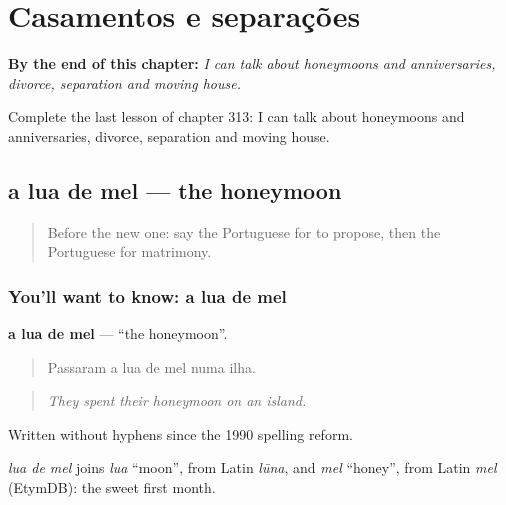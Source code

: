 
\chapter{Casamentos e separações}
\label{ch:pt-casamentos-e-separacoes}

\begin{chapteropening}
\textbf{By the end of this chapter:} \emph{I can talk about honeymoons and anniversaries, divorce, separation and moving house.}

Complete the last lesson of chapter 313: I can talk about honeymoons and anniversaries, divorce, separation and moving house.
\end{chapteropening}

\section[a lua de mel]{a lua de mel — the honeymoon}

\label{lesson:PT-C313-lua-de-mel}



\begin{quote}
Before the new one: say the Portuguese for to propose, then the Portuguese for matrimony.
\end{quote}

\subsection*{You'll want to know: a lua de mel}
\textbf{a lua de mel} — \textquotedblleft{}the honeymoon\textquotedblright{}.

\begin{quote}
Passaram a lua de mel numa ilha.
\end{quote}

\begin{quote}
\emph{They spent their honeymoon on an island.}
\end{quote}

Written without hyphens since the 1990 spelling reform.

\begin{cousinweb}
\emph{lua de mel} joins \emph{lua} \textquotedblleft{}moon\textquotedblright{}, from Latin \emph{lūna}, and \emph{mel} \textquotedblleft{}honey\textquotedblright{}, from Latin \emph{mel} (EtymDB): the sweet first month.
\end{cousinweb}

